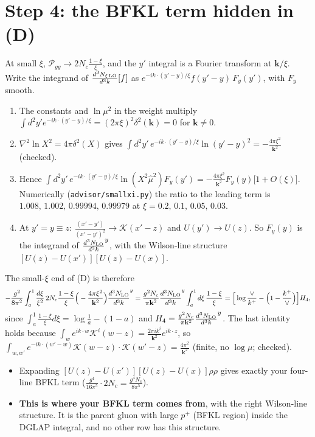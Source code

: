 \documentclass[10pt]{article}
\numberwithin{equation}{section}
\newcommand{\NLO}[1]{\frac{d^3N_{#1}}{d^3k}}
\begin{document}
\section{Step 4: the BFKL term hidden in (D)}
At small $\xi$, $\mathcal P_{gg}\to2N_c\frac{1-\xi}{\xi}$, and the $y'$ integral is a Fourier transform at $\mathbf k/\xi$. Write the integrand of $\NLO{\xi\,\rm LO}[f]$ as $e^{-ik\cdot(y'-y)/\xi}f(y'-y)\,F_{y}(y')$, with $F_y$ smooth.
\begin{enumerate}
\item The constants and $\ln\mu^2$ in the weight multiply $\int d^2y'e^{-ik\cdot(y'-y)/\xi}=(2\pi\xi)^2\delta^2(\mathbf k)=0$ for $\mathbf k\neq0$.
\item $\nabla^2\ln X^2=4\pi\delta^2(X)$ gives $\int d^2y'\,e^{-ik\cdot(y'-y)/\xi}\ln(y'-y)^2=-\frac{4\pi\xi^2}{\mathbf k^2}$ (checked).
\item Hence $\int d^2y'\,e^{-ik\cdot(y'-y)/\xi}\ln(X^2\hat\mu^2)F_y(y')=-\frac{4\pi\xi^2}{\mathbf k^2}F_y(y)\big[1+O(\xi)\big]$. Numerically (\texttt{advisor/smallxi.py}) the ratio to the leading term is $1.008,\,1.002,\,0.99994,\,0.99979$ at $\xi=0.2,\,0.1,\,0.05,\,0.03$.
\item At $y'=y\equiv z$: $\frac{(x'-y')}{(x'-y')^2}\to\mathcal K(x'-z)$ and $U(y')\to U(z)$. So $F_y(y)$ is the integrand of $\NLO{\rm LO}^{y}$, with the Wilson-line structure $[U(z)-U(x')][U(z)-U(x)]$.
\end{enumerate}
The small-$\xi$ end of (D) is therefore
\begin{equation}
-\frac{g^2}{8\pi^2}\int_a^1\frac{d\xi}{\xi^2}\,2N_c\frac{1-\xi}{\xi}\Big(-\frac{4\pi\xi^2}{\mathbf k^2}\Big)\NLO{\rm LO}^{y}=\frac{g^2N_c}{\pi\mathbf k^2}\NLO{\rm LO}^{y}\int_a^1d\xi\,\frac{1-\xi}{\xi}=\Big[\log\frac{\vee}{k^+}-\Big(1-\frac{k^+}{\vee}\Big)\Big]H_4 ,\label{eq:hidden}
\end{equation}
since $\int_a^1\frac{1-\xi}{\xi}d\xi=\log\frac1a-(1-a)$ and $H_4=\frac{g^2N_c}{\pi\mathbf k^2}\NLO{\rm LO}^{y}$. The last identity holds because $\int_w e^{ik\cdot w}\mathcal K^i(w-z)=\frac{2\pi ik^i}{\mathbf k^2}e^{ik\cdot z}$, so $\int_{w,w'}e^{-ik\cdot(w'-w)}\mathcal K(w-z)\cdot\mathcal K(w'-z)=\frac{4\pi^2}{\mathbf k^2}$ (finite, no $\log\mu$; checked).
\begin{itemize}
\item Expanding $[U(z)-U(x')][U(z)-U(x)]\rho\rho$ gives exactly your four-line BFKL term ($\frac{g^4}{16\pi^5}\cdot2N_c=\frac{g^4N_c}{8\pi^5}$).
\item \textbf{This is where your BFKL term comes from}, with the right Wilson-line structure. It is the parent gluon with large $p^+$ (BFKL region) inside the DGLAP integral, and no other row has this structure.
\end{itemize}
\end{document}
